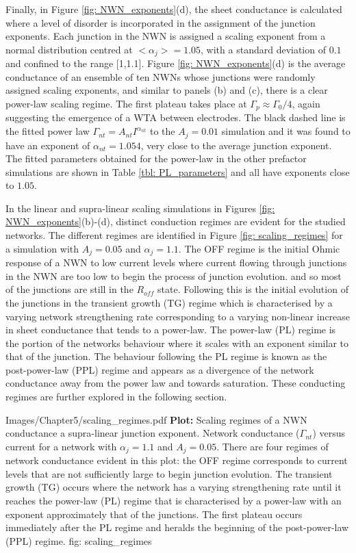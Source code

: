 Finally, in Figure \ref{fig: NWN_exponents}(d), the sheet conductance is calculated where a level of disorder is incorporated in the assignment of the junction exponents. Each junction in the NWN is assigned a scaling exponent from a normal distribution centred at $<\alpha_j> = 1.05$, with a standard deviation of $0.1$ and confined to the range [1,1.1]. Figure \ref{fig: NWN_exponents}(d) is the average conductance of an ensemble of ten NWNs whose junctions were randomly assigned scaling exponents, and similar to panels (b) and (c), there is a clear power-law scaling regime. The first plateau takes place at $\Gamma_p \approx \Gamma_0/4$, again suggesting the emergence of a WTA between electrodes. The black dashed line is the fitted power law $\Gamma_{nt} = A_{nt} I^{\alpha_{nt}}$ to the $A_j = 0.01$ simulation and it was found to have an exponent of $\alpha_{nt} = 1.054$, very close to the average junction exponent. The fitted parameters obtained for the power-law in the other prefactor simulations are shown in Table \ref{tbl: PL_parameters} and all have exponents close to $1.05$. 

In the linear and supra-linear scaling simulations in Figures \ref{fig: NWN_exponents}(b)-(d), distinct conduction regimes are evident for the studied networks. The different regimes are identified in Figure \ref{fig: scaling_regimes} for a simulation with $A_j = 0.05$ and $\alpha_j = 1.1$. The OFF regime is the initial Ohmic response of a NWN to low current levels where current flowing through junctions in the NWN are too low to begin the process of junction evolution. and so most of the junctions are still in the $R_{off}$ state. Following this is the initial evolution of the junctions in the transient growth (TG) regime which is characterised by a varying network strengthening rate corresponding to a varying non-linear increase in sheet conductance that tends to a power-law. The power-law (PL) regime is the portion of the networks behaviour where it scales with an exponent similar to that of the junction. The behaviour following the PL regime is known as the post-power-law (PPL) regime and appears as a divergence of the network conductance away from the power law and towards saturation. These conducting regimes are further explored in the following section.

{Images/Chapter5/scaling_regimes.pdf}
{\textbf{Plot:} Scaling regimes of a NWN conductance a supra-linear junction exponent.}
{Network conductance ($\Gamma_{nt}$) versus current for a network with $\alpha_j=1.1$ and $A_j = 0.05$. There are four regimes of network conductance evident in this plot: the OFF regime corresponds to current levels that are not sufficiently large to begin junction evolution. The transient growth (TG) occurs where the network has a varying strengthening rate until it reaches the power-law (PL) regime that is characterised by a power-law with an exponent approximately that of the junctions. The first plateau occurs immediately after the PL regime and heralds the beginning of the post-power-law (PPL) regime.}
{fig: scaling_regimes}

